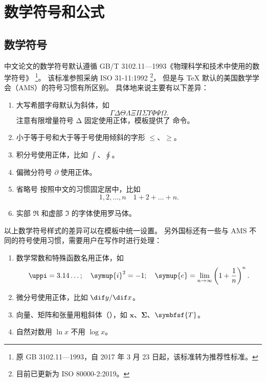
\chapter{数学符号和公式}

\section{数学符号}

中文论文的数学符号默认遵循 GB/T 3102.11—1993《物理科学和技术中使用的数学符号》
\footnote{原 GB 3102.11—1993，自 2017 年 3 月 23 日起，该标准转为推荐性标准。}。
该标准参照采纳 ISO 31-11:1992 \footnote{目前已更新为 ISO 80000-2:2019。}，
但是与 \TeX{} 默认的美国数学学会（AMS）的符号习惯有所区别。
具体地来说主要有以下差异：
\begin{enumerate}
  \item 大写希腊字母默认为斜体，如
    \begin{equation*}
      \Gamma \Delta \Theta \Lambda \Xi \Pi \Sigma \Upsilon \Phi \Psi \Omega.
    \end{equation*}
    注意有限增量符号 $\increment$ 固定使用正体，模板提供了  命令。
  \item 小于等于号和大于等于号使用倾斜的字形 $\le$、$\ge$。
  \item 积分号使用正体，比如 $\int$、$\oint$。
  \item
    偏微分符号 $\partial$ 使用正体。
  \item
    省略号  按照中文的习惯固定居中，比如
    \begin{equation*}
      1, 2, \dots, n \quad 1 + 2 + \dots + n.
    \end{equation*}
  \item
    实部 $\Re$ 和虚部 $\Im$ 的字体使用罗马体。
\end{enumerate}

以上数学符号样式的差异可以在模板中统一设置。
另外国标还有一些与 AMS 不同的符号使用习惯，需要用户在写作时进行处理：
\begin{enumerate}
  \item 数学常数和特殊函数名用正体，如
    \begin{equation*}
      \uppi = 3.14\dots; \quad
      \symup{i}^2 = -1; \quad
      \symup{e} = \lim_{n \to \infty} \left( 1 + \frac{1}{n} \right)^n.
    \end{equation*}
  \item 微分号使用正体，比如 $\dif y / \dif x$。
  \item 向量、矩阵和张量用粗斜体（），如 $\symbf{x}$、$\symbf{\Sigma}$、$\symbfsf{T}$。
  \item 自然对数用 $\ln x$ 不用 $\log x$。
\end{enumerate}


